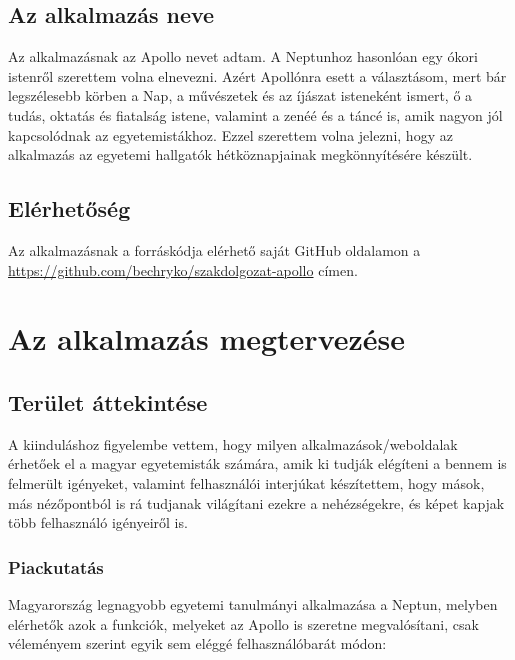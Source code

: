 \documentclass[a4paper,12pt]{report}
\begin{document}
\section{Az alkalmazás neve}

Az alkalmazásnak az Apollo nevet adtam. A Neptunhoz hasonlóan egy ókori istenről szerettem volna elnevezni. Azért Apollónra esett a választásom, mert bár legszélesebb körben a Nap, a művészetek és az íjászat isteneként ismert, ő a tudás, oktatás és fiatalság istene, valamint a zenéé és a táncé is, amik nagyon jól kapcsolódnak az egyetemistákhoz. Ezzel szerettem volna jelezni, hogy az alkalmazás az egyetemi hallgatók hétköznapjainak megkönnyítésére készült.

\section{Elérhetőség}

Az alkalmazásnak a forráskódja elérhető saját GitHub oldalamon a \url{https://github.com/bechryko/szakdolgozat-apollo} címen.

\chapter{Az alkalmazás megtervezése}

\section{Terület áttekintése}

A kiinduláshoz figyelembe vettem, hogy milyen alkalmazások/weboldalak érhetőek el a magyar egyetemisták számára, amik ki tudják elégíteni a bennem is felmerült igényeket, valamint felhasználói interjúkat készítettem, hogy mások, más nézőpontból is rá tudjanak világítani ezekre a nehézségekre, és képet kapjak több felhasználó igényeiről is.

\subsection{Piackutatás}

Magyarország legnagyobb egyetemi tanulmányi alkalmazása a Neptun, melyben elérhetők azok a funkciók, melyeket az Apollo is szeretne megvalósítani, csak véleményem szerint egyik sem eléggé felhasználóbarát módon:
\end{document}

